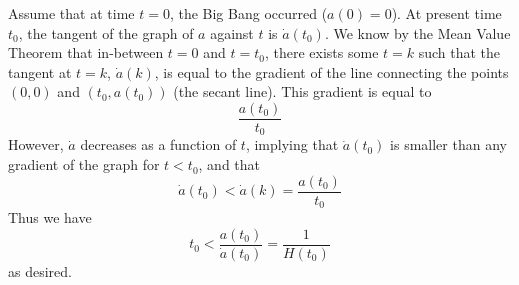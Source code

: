 \documentclass{article}
\begin{document}
Assume that at time $t=0$, the Big Bang occurred ($a(0)=0$). At present time $t_0$, the tangent of the graph of $a$ against $t$ is $\dot{a}(t_0)$. We know by the Mean Value Theorem that in-between $t=0$ and $t=t_0$, there exists some $t=k$ such that the tangent at $t=k$, $\dot{a}(k)$, is equal to the gradient of the line connecting the points $(0, 0)$ and $(t_0, a(t_0))$ (the secant line). This gradient is equal to
\begin{equation*}
    \frac{a(t_0)}{t_0}
\end{equation*} However, $\dot{a}$ decreases as a function of $t$, implying that $\dot{a}(t_0)$ is smaller than any gradient of the graph for $t<t_0$, and that 
\begin{equation*}
    \dot{a}(t_0) < \dot{a}(k) = \frac{a(t_0)}{t_0}
\end{equation*}
Thus we have 
\begin{equation*}
    t_0 < \frac{a(t_0)}{\dot{a}(t_0)} = \frac{1}{H(t_0)}
\end{equation*}
as desired.\\ \\\
\end{document}
